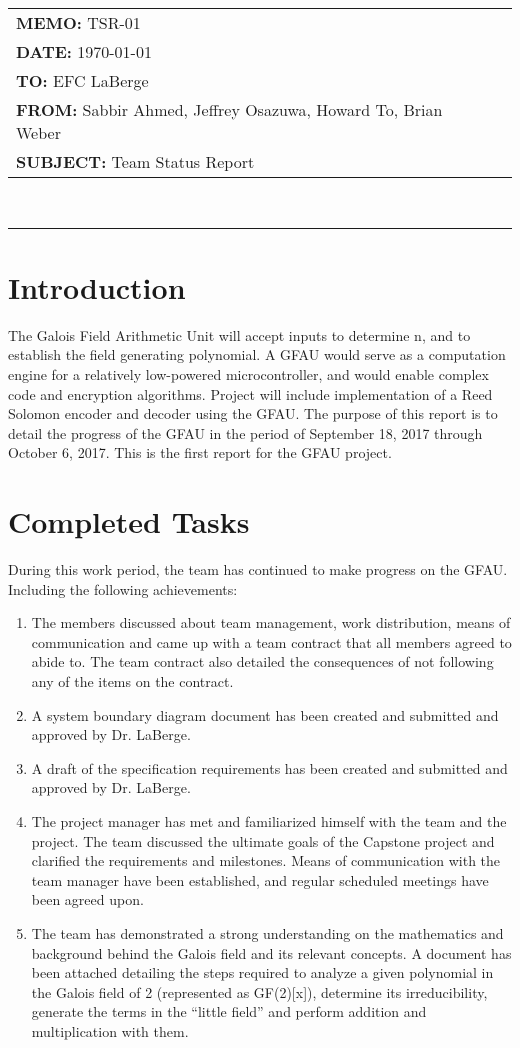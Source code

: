 \documentclass[paper=usletter, fontsize=12pt]{article}
\newcommand{\Sabbir}{Sabbir Ahmed}
\newcommand{\Jeffrey}{Jeffrey Osazuwa}
\newcommand{\Howard}{Howard To}
\newcommand{\Brian}{Brian Weber}
\newcommand{\documentinfo}[5]{
    \begin{centering}
        \parbox{6.8in}{
        \begin{spacing}{1}
            \begin{flushleft}
                \begin{tabular}{l l}
                    #1 \\
                    #2 \\
                    #3 \\
                    #4 \\
                    #5 \\
                \end{tabular} \\
                \rule{\textwidth}{1pt}
            \end{flushleft}
        \end{spacing}
        }
    \end{centering}
}
\begin{document}
    \documentinfo{\textbf{MEMO:} TSR-01}{\textbf{DATE: }{\today}}{\textbf{TO: } EFC LaBerge}{\textbf{FROM: }\Sabbir, \Jeffrey, \Howard, \Brian}{\textbf{SUBJECT: } Team Status Report}

    \vspace{-0.3in}
    \section{Introduction}
    The Galois Field Arithmetic Unit will accept inputs to determine n, and to establish the field generating polynomial. A GFAU would serve as a computation engine for a relatively low-powered microcontroller, and would enable complex code and encryption algorithms. Project will include implementation of a Reed Solomon encoder and decoder using the GFAU. The purpose of this report is to detail the progress of the GFAU in the period of September 18, 2017 through October 6, 2017. This is the first report for the GFAU project. 


    \section{Completed Tasks}
    During this work period, the team has continued to make progress on the GFAU. Including the following achievements:
    \begin{enumerate}[label=\alph*)]

        \item The members discussed about team management, work distribution, means of communication and came up with a team contract that all members agreed to abide to. The team contract also detailed the consequences of not following any of the items on the contract.

        \item A system boundary diagram document has been created and submitted and approved by Dr. LaBerge.

        \item A draft of the specification requirements has been created and submitted and approved by Dr. LaBerge.

        \item The project manager has met and familiarized himself with the team and the project. The team discussed the ultimate goals of the Capstone project and clarified the requirements and milestones. Means of communication with the team manager have been established, and regular scheduled meetings have been agreed upon.

        \item The team has demonstrated a strong understanding on the mathematics and background behind the Galois field and its relevant concepts. A document has been attached detailing the steps required to analyze a given polynomial in the Galois field of 2 (represented as GF(2)[x]), determine its irreducibility, generate the terms in the “little field” and perform addition and multiplication with them.

    \end{enumerate}
\end{document}
